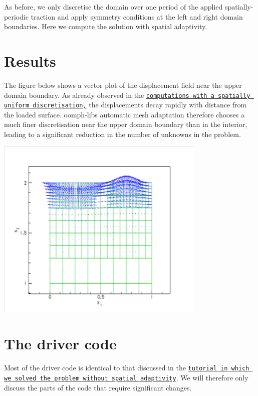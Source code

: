 As before, we only discretise the domain over one period of the applied spatially-\/periodic traction and apply symmetry conditions at the left and right domain boundaries. Here we compute the solution with spatial adaptivity.



 

\hypertarget{index_results}{}\section{Results}\label{index_results}
The figure below shows a vector plot of the displacement field near the upper domain boundary. As already observed in the \href{../../periodic_load/html/index.html}{\tt computations with a spatially uniform discretisation,} the displacements decay rapidly with distance from the loaded surface. {\ttfamily oomph-\/lib\textquotesingle{}s} automatic mesh adaptation therefore chooses a much finer discretisation near the upper domain boundary than in the interior, leading to a significant reduction in the number of unknowns in the problem.

 
\begin{DoxyImage}
\includegraphics[width=0.75\textwidth]{displ}
\end{DoxyImage}




 

\hypertarget{index_main}{}\section{The driver code}\label{index_main}
Most of the driver code is identical to that discussed in the \href{../../periodic_load/html/index.html}{\tt tutorial in which we solved the problem without spatial adaptivity}. We will therefore only discuss the parts of the code that require significant changes.



